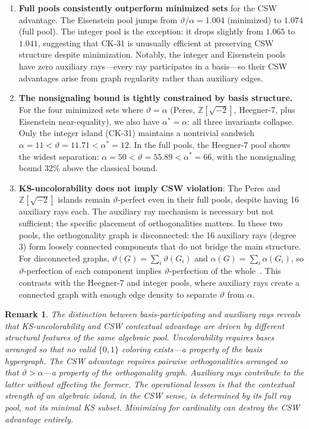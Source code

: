 \documentclass[12pt,a4paper]{article}
\newtheorem{remark}[theorem]{Remark}
\newcommand{\Z}{\mathbb{Z}}
\begin{document}
\begin{enumerate}
    \item \textbf{Full pools consistently outperform minimized sets} for the CSW advantage. The Eisenstein pool jumps from $\vartheta/\alpha = 1.004$ (minimized) to $1.074$ (full pool). The integer pool is the exception: it drops slightly from $1.065$ to $1.041$, suggesting that CK-31 is unusually efficient at preserving CSW structure despite minimization. Notably, the integer and Eisenstein pools have zero auxiliary rays---every ray participates in a basis---so their CSW advantages arise from graph regularity rather than auxiliary edges.

    \item \textbf{The nonsignaling bound is tightly constrained by basis structure.} For the four minimized sets where $\vartheta = \alpha$ (Peres, $\Z[\sqrt{-2}]$, Heegner-7, plus Eisenstein near-equality), we also have $\alpha^* = \alpha$: all three invariants collapse. Only the integer island (CK-31) maintains a nontrivial sandwich $\alpha = 11 < \vartheta = 11.71 < \alpha^* = 12$. In the full pools, the Heegner-7 pool shows the widest separation: $\alpha = 50 < \vartheta = 55.89 < \alpha^* = 66$, with the nonsignaling bound 32\% above the classical bound.

    \item \textbf{KS-uncolorability does not imply CSW violation}: The Peres and $\Z[\sqrt{-2}]$ islands remain $\vartheta$-perfect even in their full pools, despite having 16 auxiliary rays each. The auxiliary ray mechanism is necessary but not sufficient; the specific placement of orthogonalities matters. In these two pools, the orthogonality graph is disconnected: the 16 auxiliary rays (degree 3) form loosely connected components that do not bridge the main structure. For disconnected graphs, $\vartheta(G) = \sum_i \vartheta(G_i)$ and $\alpha(G) = \sum_i \alpha(G_i)$, so $\vartheta$-perfection of each component implies $\vartheta$-perfection of the whole~\cite{Knuth1994}. This contrasts with the Heegner-7 and integer pools, where auxiliary rays create a connected graph with enough edge density to separate $\vartheta$ from $\alpha$.
\end{enumerate}

\begin{remark}
The distinction between basis-participating and auxiliary rays reveals that KS-uncolorability and CSW contextual advantage are driven by different structural features of the same algebraic pool. Uncolorability requires bases arranged so that no valid $\{0,1\}$ coloring exists---a property of the basis \emph{hypergraph}. The CSW advantage requires pairwise orthogonalities arranged so that $\vartheta > \alpha$---a property of the orthogonality \emph{graph}. Auxiliary rays contribute to the latter without affecting the former. The operational lesson is that the contextual strength of an algebraic island, in the CSW sense, is determined by its full ray pool, not its minimal KS subset. Minimizing for cardinality can destroy the CSW advantage entirely.
\end{remark}
\end{document}
